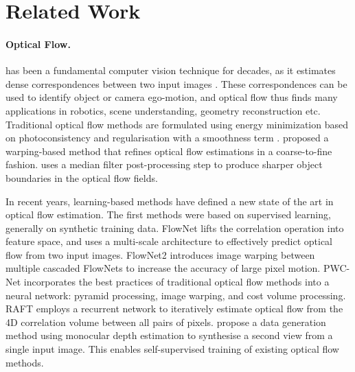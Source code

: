 \section{Related Work}

\paragraph{Optical Flow.}

has been a fundamental computer vision technique for decades, as it estimates dense correspondences between two input images \cite{BakerSLRBS2011,MenzeHG2018}.
These correspondences can be used to identify object or camera ego-motion, and optical flow thus finds many applications in robotics, scene understanding, geometry reconstruction etc.
%
Traditional optical flow methods are formulated using energy minimization based on photoconsistency and regularisation with a smoothness term \cite{KroegTDV2016, HornS1981, LucasK1981, BlackA1991}.
%
\citet{BroxBPW2004} proposed a warping-based method that refines optical flow estimations in a coarse-to-fine fashion.
%
\citet{SunRB2014} uses a median filter post-processing step to produce sharper object boundaries in the optical flow fields.


In recent years, learning-based methods have defined a new state of the art in optical flow estimation.
%
%
The first methods were based on supervised learning, generally on synthetic training data.
%
FlowNet \cite{DosovFIHHGSCB2015} lifts the correlation operation into feature space, and uses a multi-scale architecture to effectively predict optical flow from two input images.
%
FlowNet2 \cite{IlgMSKDB2017} introduces image warping between multiple cascaded FlowNets to increase the accuracy of large pixel motion.
%
PWC-Net \cite{SunYLK2020} incorporates the best practices of traditional optical flow methods into a neural network: pyramid processing, image warping, and cost volume processing.
%
RAFT \cite{TeedD2020a} employs a recurrent network to iteratively estimate optical flow from the 4D correlation volume between all pairs of pixels. %
%
\citet{AleotPM2021} propose a data generation method using monocular depth estimation to synthesise a second view from a single input image.
This enables self-supervised training of existing optical flow methods.


